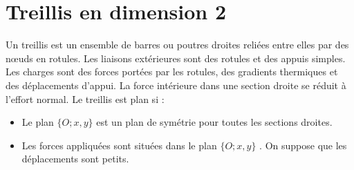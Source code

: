 \documentclass[a4paper]{article}
\begin{document}
\section{Treillis en dimension 2}
Un treillis est un ensemble de barres ou poutres droites reliées entre elles par des nœuds en  rotules. Les liaisons extérieures sont des rotules et des appuis simples. Les charges sont des forces portées par les rotules, des gradients thermiques et des déplacements d'appui. La force intérieure dans une section droite se réduit à l'effort normal.
Le treillis est plan si :
\begin{itemize}
\item Le plan $\{O; x, y\}$ est un plan de symétrie pour toutes les sections droites.
\item Les forces appliquées sont situées dans le plan $\{O; x, y\}$ . On suppose que les déplacements sont petits.
\end{itemize}
\end{document}
